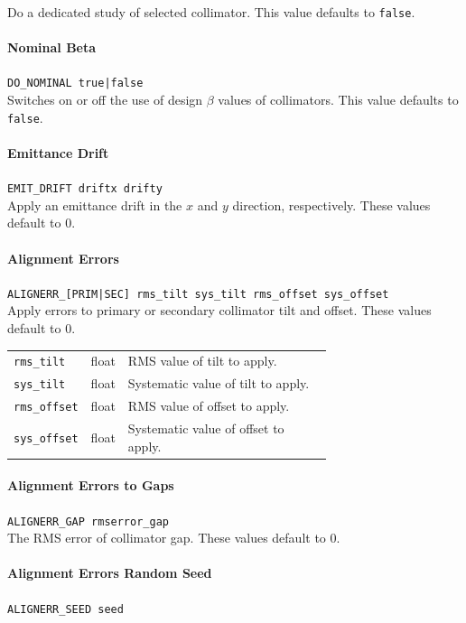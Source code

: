 Do a dedicated study of selected collimator.
This value defaults to \texttt{false}.

\paragraph{Nominal Beta} \texttt{DO\_NOMINAL true|false}\\

Switches on or off the use of design $\beta$ values of collimators.
This value defaults to \texttt{false}.

\paragraph{Emittance Drift} \texttt{EMIT\_DRIFT driftx drifty}\\

Apply an emittance drift in the $x$ and $y$ direction, respectively.
These values default to 0.

\paragraph{Alignment Errors} \texttt{ALIGNERR\_[PRIM|SEC] rms\_tilt sys\_tilt rms\_offset sys\_offset}\\

Apply errors to primary or secondary collimator tilt and offset.
These values default to 0.

\bigskip
\begin{tabular}{@{}llp{0.7\linewidth}}
    \texttt{rms\_tilt}   & float & RMS value of tilt to apply. \\
    \texttt{sys\_tilt}   & float & Systematic value of tilt to apply. \\
    \texttt{rms\_offset} & float & RMS value of offset to apply. \\
    \texttt{sys\_offset} & float & Systematic value of offset to apply.
\end{tabular}

\paragraph{Alignment Errors to Gaps} \texttt{ALIGNERR\_GAP rmserror\_gap}\\

The RMS error of collimator gap.
These values default to 0.

\paragraph{Alignment Errors Random Seed} \texttt{ALIGNERR\_SEED seed}\\

